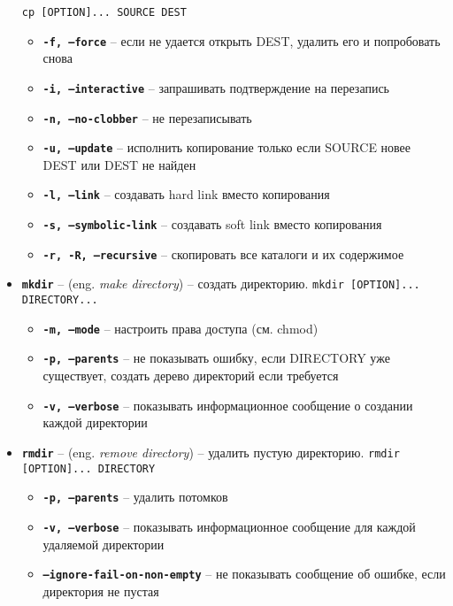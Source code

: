\documentclass[12pt, a4paper]{article}
\begin{document}
\begin{itemize}
    \texttt{cp [OPTION]... SOURCE DEST}
    \begin{itemize}
      \item \textbf{\texttt{-f, --force}} -- если не удается открыть DEST,
        удалить его и попробовать снова
      \item \textbf{\texttt{-i, --interactive}} -- запрашивать подтверждение на
        перезапись
      \item \textbf{\texttt{-n, --no-clobber}} -- не перезаписывать
      \item \textbf{\texttt{-u, --update}} -- исполнить копирование только если
        SOURCE новее DEST или DEST не найден
      \item \textbf{\texttt{-l, --link}} -- создавать hard link вместо копирования
      \item \textbf{\texttt{-s, --symbolic-link}} -- создавать soft link вместо
        копирования
      \item \textbf{\texttt{-r, -R, --recursive}} -- скопировать все каталоги и
        их содержимое
    \end{itemize}
  \item \textbf{\texttt{mkdir}} -- (eng. \textit{make directory}) -- создать
    директорию. \texttt{mkdir [OPTION]... DIRECTORY...}
    \begin{itemize}
      \item \textbf{\texttt{-m, --mode}} -- настроить права доступа (см. chmod)
      \item \textbf{\texttt{-p, --parents}} -- не показывать ошибку, если
        DIRECTORY уже существует, создать дерево директорий если требуется
      \item \textbf{\texttt{-v, --verbose}} -- показывать информационное
        сообщение о создании каждой директории
    \end{itemize}
  \item \textbf{\texttt{rmdir}} -- (eng. \textit{remove directory}) -- удалить
    пустую директорию. \texttt{rmdir [OPTION]... DIRECTORY}
  \begin{itemize}
    \item \textbf{\texttt{-p, --parents}} -- удалить потомков
    \item \textbf{\texttt{-v, --verbose}} -- показывать информационное
      сообщение для каждой удаляемой директории
    \item \textbf{\texttt{--ignore-fail-on-non-empty}} -- не показывать
      сообщение об ошибке, если директория не пустая
  \end{itemize}

\end{itemize}
\end{document}
